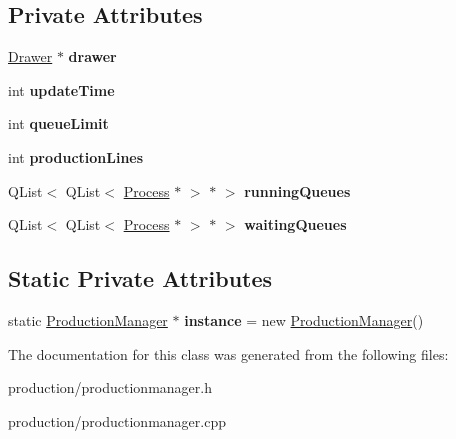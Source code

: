 \subsection*{Private Attributes}
\begin{DoxyCompactItemize}
\item 
\mbox{\label{classProductionManager_a5e38737a212a31a7d82eed5ef102f611}} 
\hyperlink{classDrawer}{Drawer} $\ast$ {\bfseries drawer}
\item 
\mbox{\label{classProductionManager_aa7906bebe33d0069d9df51ab729b5b58}} 
int {\bfseries update\+Time}
\item 
\mbox{\label{classProductionManager_af323dad06f6b9992c15b8d0704a1cc13}} 
int {\bfseries queue\+Limit}
\item 
\mbox{\label{classProductionManager_ad08303dc493a0614178600b603ff1954}} 
int {\bfseries production\+Lines}
\item 
\mbox{\label{classProductionManager_a1be2f7aa48015f5dc2b434f73c89dfa1}} 
Q\+List$<$ Q\+List$<$ \hyperlink{classProcess}{Process} $\ast$ $>$ $\ast$ $>$ {\bfseries running\+Queues}
\item 
\mbox{\label{classProductionManager_af3555a4bd234cbfb31cabe70c2008b17}} 
Q\+List$<$ Q\+List$<$ \hyperlink{classProcess}{Process} $\ast$ $>$ $\ast$ $>$ {\bfseries waiting\+Queues}
\end{DoxyCompactItemize}
\subsection*{Static Private Attributes}
\begin{DoxyCompactItemize}
\item 
\mbox{\label{classProductionManager_a24b4a3f2e006dc488f622970d10c0a80}} 
static \hyperlink{classProductionManager}{Production\+Manager} $\ast$ {\bfseries instance} = new \hyperlink{classProductionManager}{Production\+Manager}()
\end{DoxyCompactItemize}


The documentation for this class was generated from the following files\+:\begin{DoxyCompactItemize}
\item 
production/productionmanager.\+h\item 
production/productionmanager.\+cpp\end{DoxyCompactItemize}
